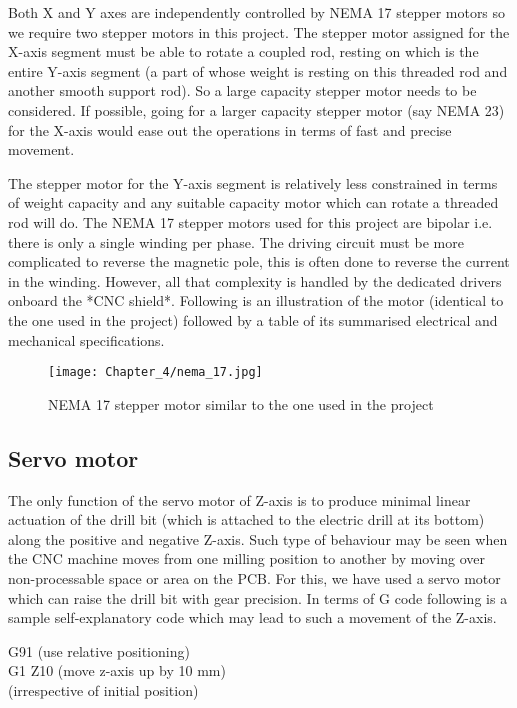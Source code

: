 Both X and Y axes are independently controlled by NEMA 17 stepper motors so we require two stepper motors in this project. The stepper motor assigned for the X-axis segment must be able to rotate a coupled rod, resting on which is the entire Y-axis segment (a part of whose weight is resting on this threaded rod and another smooth support rod). So a large capacity stepper motor needs to be considered. If possible, going for a larger capacity stepper motor (say NEMA 23) for the X-axis would ease out the operations in terms of fast and precise movement. \par

The stepper motor for the Y-axis segment is relatively less constrained in terms of weight capacity and any suitable capacity motor which can rotate a threaded rod will do. The NEMA 17 stepper motors used for this project are bipolar i.e. there is only a single winding per phase. The driving circuit must be more complicated to reverse the magnetic pole, this is often done to reverse the current in the winding. However, all that complexity is handled by the dedicated drivers onboard the *CNC shield*. Following is an illustration of the motor (identical to the one used in the project) followed by a table of its summarised electrical and mechanical specifications.

\begin{figure}[h]
    \centering
    \texttt{[image: Chapter\_4/nema\_17.jpg]}
    \caption{NEMA 17 stepper motor similar to the one used in the project}
    \label{fig:stepper}
\end{figure}



\subsection{Servo motor}

The only function of the servo motor of Z-axis is to produce minimal linear actuation of the drill bit (which is attached to the electric drill at its bottom) along the positive and negative Z-axis. Such type of behaviour may be seen when the CNC machine moves from one milling position to another by moving over non-processable space or area on the PCB. For this, we have used a servo motor which can raise the drill bit with gear precision. In terms of G code following is a sample self-explanatory code which may lead to such a movement of the Z-axis. 


\begin{flushleft}
{\selectfont G91 (use relative positioning) \\
                             G1 Z10 (move z-axis up by 10 mm) \\
                            \hspace{18.2mm}(irrespective of initial position)
}
\end{flushleft}

